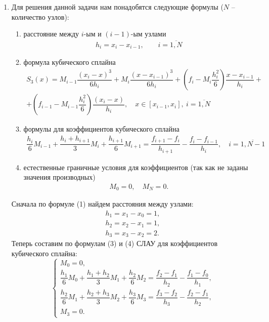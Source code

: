 \documentclass[a4paper, 12pt]{article}
\begin{document}
\begin{enumerate}
	\newpage
	\item \hypertarget{t11}{}
	Для решения данной задачи нам понадобятся следующие формулы ($N$ -- количество узлов):\begin{enumerate}
		\item расстояние между $i$-ым и $(i-1)$-ым узлами \begin{eqnarray}
			h_i=x_i - x_{i-1},\qquad i=\overline{1,N}\label{1}
		\end{eqnarray}
		\item формула кубического сплайна\begin{multline}
			S_3(x) = M_{i-1}\dfrac{(x_i - x)^3}{6h_i} + M_{i}\dfrac{(x-x_{i-1})^3}{6h_i} + \left(f_i - M_i\dfrac{h_i^2}{6}\right)\dfrac{x-x_{i-1}}{h_i} +\\+ \left(f_{i-1} - M_{i-1}\dfrac{h_i^2}{6}\right)\dfrac{(x_i - x)}{h_i},\quad x\in [x_{i-1}, x_i],\ i = \overline{1,N}
		\end{multline}
		\item формулы для коэффициентов кубического сплайна
		\begin{multline}
			\dfrac{h_i}{6}M_{i-1} + \dfrac{h_i + h_{i+1}}{3}M_i + \dfrac{h_{i+1}}{6}M_{i+1} = \dfrac{f_{i+1} - f_i}{h_{i+1}} - \dfrac{f_i - f_{i-1}}{h_i},\quad i = \overline {1,N-1}
		\end{multline}
		\item естественные граничные условия для коэффициентов (так как не заданы значения производных) \begin{eqnarray}
			M_0 = 0,\quad M_N = 0.
		\end{eqnarray}
	\end{enumerate}
	Сначала по формуле (1) найдем расстояния между узлами:
	$$\begin{matrix}
		h_1 = x_1 - x_0 = 1,\\
		h_2 = x_2 - x_1 = 1,\\
		h_3 = x_3 - x_2 = 2.
	\end{matrix}$$
	Теперь составим по формулам (3) и (4) СЛАУ для коэффициентов кубического сплайна:
	$$\begin{cases}
		M_0 = 0,\\
		\dfrac{h_1}{6}M_{0} + \dfrac{h_1 + h_{2}}{3}M_1 + \dfrac{h_{2}}{6}M_{2} = \dfrac{f_{2} - f_1}{h_{2}} - \dfrac{f_1 - f_{0}}{h_1},\\
		\dfrac{h_2}{6}M_{1} + \dfrac{h_2 + h_{3}}{3}M_2 + \dfrac{h_{3}}{6}M_{3} = \dfrac{f_{3} - f_2}{h_{3}} - \dfrac{f_2 - f_{1}}{h_2},\\
		M_3 = 0.
	\end{cases}$$

\end{enumerate}
\end{document}
